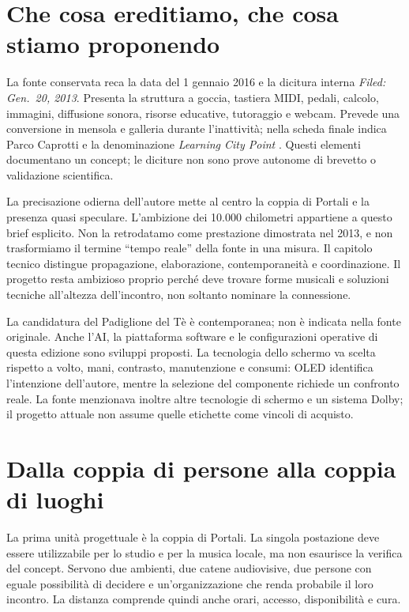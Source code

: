 \section{Che cosa ereditiamo, che cosa stiamo proponendo}
La fonte conservata reca la data del 1 gennaio 2016 e la dicitura interna \emph{Filed: Gen.\ 20, 2013}. Presenta la struttura a goccia, tastiera MIDI, pedali, calcolo, immagini, diffusione sonora, risorse educative, tutoraggio e webcam. Prevede una conversione in mensola e galleria durante l'inattività; nella scheda finale indica Parco Caprotti e la denominazione \emph{Learning City Point} \cite[pp.~2--5]{terzi_peeragogy_2016}. Questi elementi documentano un concept; le diciture non sono prove autonome di brevetto o validazione scientifica.

La precisazione odierna dell'autore mette al centro la coppia di Portali e la presenza quasi speculare. L'ambizione dei 10.000 chilometri appartiene a questo brief esplicito. Non la retrodatamo come prestazione dimostrata nel 2013, e non trasformiamo il termine ``tempo reale'' della fonte in una misura. Il capitolo tecnico distingue propagazione, elaborazione, contemporaneità e coordinazione. Il progetto resta ambizioso proprio perché deve trovare forme musicali e soluzioni tecniche all'altezza dell'incontro, non soltanto nominare la connessione.

La candidatura del Padiglione del Tè è contemporanea; non è indicata nella fonte originale. Anche l'AI, la piattaforma software e le configurazioni operative di questa edizione sono sviluppi proposti. La tecnologia dello schermo va scelta rispetto a volto, mani, contrasto, manutenzione e consumi: OLED identifica l'intenzione dell'autore, mentre la selezione del componente richiede un confronto reale. La fonte menzionava inoltre altre tecnologie di schermo e un sistema Dolby; il progetto attuale non assume quelle etichette come vincoli di acquisto.

\section{Dalla coppia di persone alla coppia di luoghi}
La prima unità progettuale è la coppia di Portali. La singola postazione deve essere utilizzabile per lo studio e per la musica locale, ma non esaurisce la verifica del concept. Servono due ambienti, due catene audiovisive, due persone con eguale possibilità di decidere e un'organizzazione che renda probabile il loro incontro. La distanza comprende quindi anche orari, accesso, disponibilità e cura.

